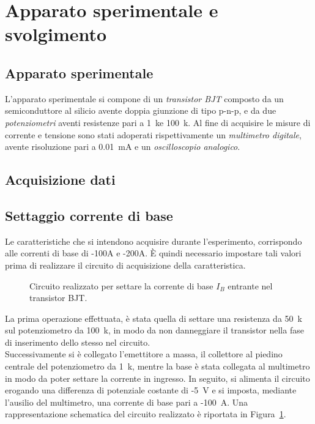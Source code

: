 \documentclass[../main.tex]{subfiles}
\begin{document}
    \section{Apparato sperimentale e svolgimento} \label{sec:acquisizione}

    \subsection{Apparato sperimentale}\label{subsec:apparato-sperimentale}

    L'apparato sperimentale si compone di un \textit{transistor BJT} composto da un
    semiconduttore al silicio avente doppia giunzione di tipo p-n-p, e da due
    \textit{potenziometri} aventi resistenze pari a 1~\;k\textohm\;e 100~\;k\textohm. Al fine di acquisire
    le misure di corrente e tensione sono stati adoperati rispettivamente un \textit{multimetro digitale},
    avente risoluzione pari a 0.01~\;mA e un \textit{oscilloscopio analogico}.
    \newpage

    \subsection{Acquisizione dati}\label{subsec:acquisizione-dati}
    \vspace{0.2cm}
    \subsection*{Settaggio corrente di base}

    Le caratteristiche che si intendono acquisire durante l'esperimento, corrispondo alle correnti
    di base di -100\;\textmu A e -200\;\textmu A. È quindi necessario impostare tali valori prima di realizzare
    il circuito di acquisizione della caratteristica.

    \begin{figure}[h!]
        \centering
        
        \caption{Circuito realizzato per settare la corrente di base $I_B$ entrante nel transistor BJT.}
        \label{fig:circuito-corrente-base}
    \end{figure}

    \noindent La prima operazione effettuata, è stata quella di settare una resistenza da 50~\;k\textohm\;
    sul potenziometro da 100~\;k\textohm, in modo da non danneggiare il
    transistor nella fase di inserimento dello stesso nel circuito. \\
    Successivamente si è collegato l'emettitore a massa, il collettore al piedino centrale
    del potenziometro da 1~\;k\textohm, mentre la base è stata collegata al multimetro
    in modo da poter settare la corrente in ingresso. In seguito, si alimenta il circuito erogando
    una differenza di potenziale costante di -5~V e si imposta, mediante l'ausilio del multimetro,
    una corrente di base pari a -100~\;\textmu A. Una rappresentazione schematica del circuito realizzato
    è riportata in Figura~\ref{fig:circuito-corrente-base}.
\end{document}
